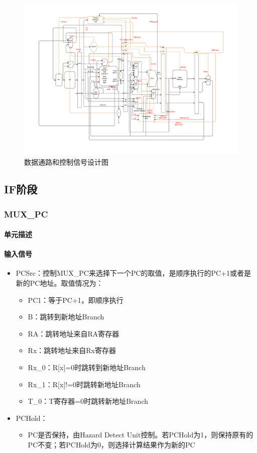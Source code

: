 \documentclass{article}
\begin{document}
\begin{figure}[h]
\includegraphics[width=1.1\columnwidth]{datapath.pdf}
\caption{数据通路和控制信号设计图}
\label{fig:datapath}
\end{figure}

\subsection{IF阶段}

\subsubsection{MUX\_PC}
\label{subsubsec:pc}
\paragraph{单元描述}
\paragraph{输入信号}
\begin{itemize}
\item PCSrc：控制MUX\_PC来选择下一个PC的取值，是顺序执行的PC+1或者是新的PC地址。取值情况为：
	\begin{itemize}
	\item PC1：等于PC+1，即顺序执行
	\item B：跳转到新地址Branch
	\item RA：跳转地址来自RA寄存器
	\item Rx：跳转地址来自Rx寄存器
	\item Rx\_0：R[x]=0时跳转到新地址Branch
	\item Rx\_1：R[x]!=0时跳转新地址Branch
	\item T\_0：T寄存器=0时跳转新地址Branch
	\end{itemize}
\item PCHold：
	\begin{itemize}
	\item PC是否保持，由Hazard Detect Unit控制。若PCHold为1，则保持原有的PC不变；若PCHold为0，则选择计算结果作为新的PC
	\end{itemize}
\end{itemize}
\end{document}

